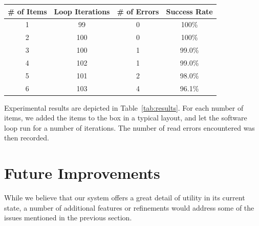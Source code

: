 \documentclass{sigchi}
\begin{document}
\begin{center}
\label{tab:results} 
\begin{tabular}{|c|c|c|c|}
 \hline
 \# of Items & Loop Iterations & \# of Errors & Success Rate \\
 \hline
 1 & 99  & 0 & 100\%  \\
 2 & 100 & 0 & 100\%  \\
 3 & 100 & 1 & 99.0\% \\
 4 & 102 & 1 & 99.0\% \\
 5 & 101 & 2 & 98.0\% \\
 6 & 103 & 4 & 96.1\% \\
 \hline
\end{tabular}
\end{center}

Experimental results are depicted in Table~\ref{tab:results}. For each number of items,
we added the items to the box in a typical layout, and let the software loop run for a
number of iterations. The number of read errors encountered was then recorded.


\section{Future Improvements} \label{future}
While we believe that our system offers a great detail of utility in its current
state, a number of additional features or refinements would address some of the
issues mentioned in the previous section.
\end{document}
